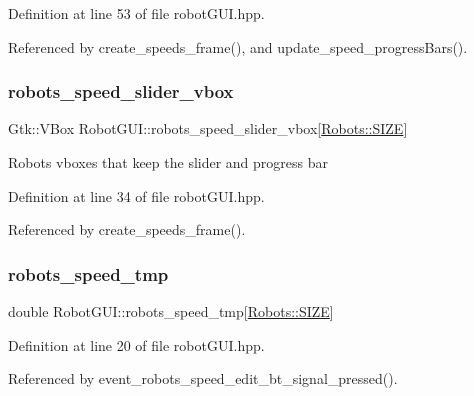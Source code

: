 Definition at line 53 of file robot\+G\+U\+I.\+hpp.



Referenced by create\+\_\+speeds\+\_\+frame(), and update\+\_\+speed\+\_\+progress\+Bars().

\mbox{\label{class_robot_g_u_i_a0e88bd14baea3275ab923b4cb5fab40d}} 
\subsubsection{\texorpdfstring{robots\+\_\+speed\+\_\+slider\+\_\+vbox}{robots\_speed\_slider\_vbox}}
{\footnotesize\ttfamily Gtk\+::\+V\+Box Robot\+G\+U\+I\+::robots\+\_\+speed\+\_\+slider\+\_\+vbox\mbox{[}\hyperlink{class_robots_ae9df2f1d345ad6740f0459956cdd4712}{Robots\+::\+S\+I\+ZE}\mbox{]}\hspace{0.3cm}{\ttfamily [private]}}

Robot\textquotesingle{}s vboxes that keep the slider and progress bar 

Definition at line 34 of file robot\+G\+U\+I.\+hpp.



Referenced by create\+\_\+speeds\+\_\+frame().

\mbox{\label{class_robot_g_u_i_ae952e428401558e2c81d1c3ed8ecb7e2}} 
\subsubsection{\texorpdfstring{robots\+\_\+speed\+\_\+tmp}{robots\_speed\_tmp}}
{\footnotesize\ttfamily double Robot\+G\+U\+I\+::robots\+\_\+speed\+\_\+tmp\mbox{[}\hyperlink{class_robots_ae9df2f1d345ad6740f0459956cdd4712}{Robots\+::\+S\+I\+ZE}\mbox{]}\hspace{0.3cm}{\ttfamily [private]}}



Definition at line 20 of file robot\+G\+U\+I.\+hpp.



Referenced by event\+\_\+robots\+\_\+speed\+\_\+edit\+\_\+bt\+\_\+signal\+\_\+pressed().

